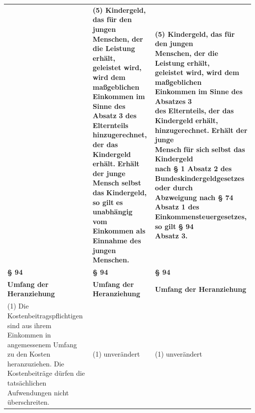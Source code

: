 \documentclass[10pt,a4paper,landscape]{article}
\begin{document}
\begin{longtable}{|L{8.2cm}|L{8.2cm}|L{8.2cm}|}
\hhline{|---|}
 & \textbf{(5) Kindergeld, das für den jungen  \newline Menschen, der die Leistung erhält,  \newline geleistet wird, wird dem maßgeblichen  \newline Einkommen im Sinne des }\textbf{\textcolor{diffred}{Absatz}}\textbf{ 3 des} \newline \textbf{\textcolor{diffred}{Elternteils hinzugerechnet,}}\textbf{ der das  \newline Kindergeld }\textbf{\textcolor{diffred}{erhält.}}\textbf{ Erhält der junge  \newline Mensch selbst das }\textbf{\textcolor{diffred}{Kindergeld,}}\textbf{ so gilt }\textbf{\textcolor{diffred}{es  \newline unabhängig vom Einkommen als  \newline Einnahme des jungen Menschen.}} & \textbf{(5) Kindergeld, das für den jungen  \newline Menschen, der die Leistung erhält,  \newline geleistet wird, wird dem maßgeblichen  \newline Einkommen im Sinne des }\textbf{\textcolor{diffgreen}{Absatzes}}\textbf{ 3  \newline des }\textbf{\textcolor{diffgreen}{Elternteils,}}\textbf{ der das Kindergeld} \newline \textbf{\textcolor{diffgreen}{erhält, hinzugerechnet.}}\textbf{ Erhält der junge  \newline Mensch }\textbf{\textcolor{diffgreen}{für sich}}\textbf{ selbst das }\textbf{\textcolor{diffgreen}{Kindergeld  \newline nach \S{} 1 Absatz 2 des  \newline Bundeskindergeldgesetzes oder durch  \newline Abzweigung nach \S{} 74 Absatz 1 des  \newline Einkommensteuergesetzes,}}\textbf{ so gilt }\textbf{\textcolor{diffgreen}{\S{} 94  \newline Absatz 3.}} \\
\hhline{|---|}
\textbf{\S{} 94} & \textbf{\S{} 94} & \textbf{\S{} 94} \\
\hhline{|---|}
\textbf{Umfang der Heranziehung } & \textbf{Umfang der Heranziehung } & \textbf{Umfang der Heranziehung } \\
\hhline{|---|}
(1) Die Kostenbeitragspflichtigen sind aus  \newline ihrem Einkommen in angemessenem  \newline Umfang zu den Kosten heranzuziehen. Die  \newline Kostenbeiträge dürfen die tatsächlichen  \newline Aufwendungen nicht überschreiten. & (1) unverändert & (1) unverändert \\

\end{longtable}
\end{document}
